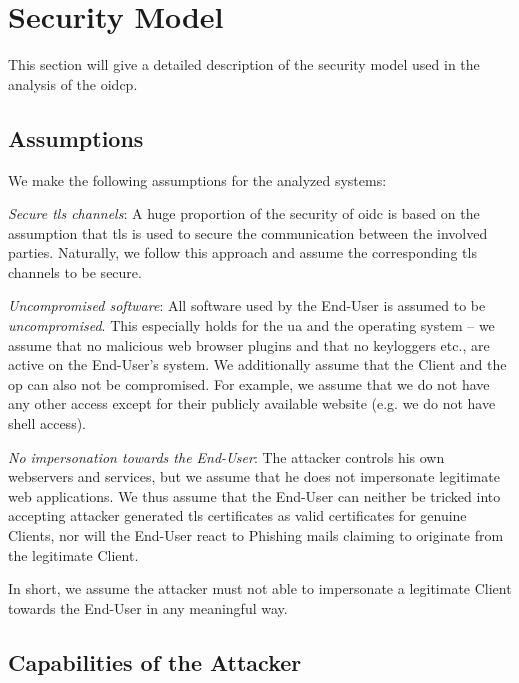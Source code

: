 \documentclass[conference,compsoc]{IEEEtran}
\renewenvironment{itemize}{\begin{compactitem}}{\end{compactitem}}
\begin{document}
\section{Security Model}
\label{sec:models}

This section will give a detailed description of the security model used in the analysis of the \gls{oidcp}.



\subsection{Assumptions}

We make the following assumptions for the analyzed systems:

\begin{itemize}
\item \emph{Secure \acrshort{tls} channels}:
A huge proportion of the security of \gls{oidc} is based on the assumption that \gls{tls} is used to secure the communication between the involved parties.
Naturally, we follow this approach and assume the corresponding \gls{tls} channels to be secure.

\item \emph{Uncompromised software}:
All software used by the End-User is assumed to be \emph{uncompromised}.
This especially holds for the \acrlong{ua} and the operating system -- we assume that no malicious web browser plugins and that no keyloggers etc., are active on the End-User's system.
We additionally assume that the Client and the \gls{op} can also not be compromised.
For example, we assume that we do not have any other access except for their publicly available website (e.g. we do not have shell access).

\item \emph{No impersonation towards the End-User}:
The attacker controls his own webservers and services, but we assume that he does not impersonate legitimate web applications.
We thus assume that the End-User can neither be tricked into accepting attacker generated \gls{tls} certificates as valid certificates for genuine Clients, nor will the End-User react to Phishing mails claiming to originate from the legitimate Client.

In short, we assume the attacker must not able to impersonate a legitimate Client towards the End-User in any meaningful way.
\end{itemize}


\subsection{Capabilities of the Attacker}
\end{document}
